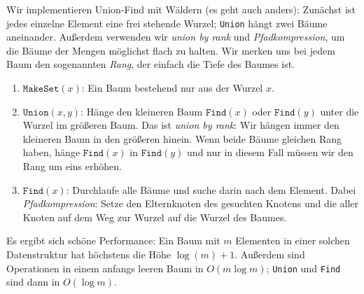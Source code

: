 \documentclass[11pt]{scrartcl}
\begin{document}
Wir implementieren Union-Find mit Wäldern (es geht auch anders): Zunächst ist jedes einzelne Element eine frei stehende Wurzel; \texttt{Union} hängt zwei Bäume aneinander. Außerdem verwenden wir \textit{union by rank} und \textit{Pfadkompression}, um die Bäume der Mengen möglichst flach zu halten. Wir merken uns bei jedem Baum den sogenannten \textit{Rang}, der einfach die Tiefe des Baumes ist.

\begin{enumerate}
\item $\texttt{MakeSet}(x)$: Ein Baum bestehend nur aus der Wurzel $x$.
\item $\texttt{Union}(x,y)$: Hänge den kleineren Baum $\texttt{Find}(x)$ oder $\texttt{Find}(y)$ unter die Wurzel im größeren Baum. Das ist \textit{union by rank}: Wir hängen immer den kleineren Baum in den größeren hinein. Wenn beide Bäume gleichen Rang haben, hänge $\texttt{Find}(x)$ in $\texttt{Find}(y)$ und nur in diesem Fall müssen wir den Rang um eins erhöhen.
\item $\texttt{Find}(x)$: Durchlaufe alle Bäume und suche darin nach dem Element. Dabei \textit{Pfadkompression}: Setze den Elternknoten des gesuchten Knotens und die aller Knoten auf dem Weg zur Wurzel auf die Wurzel des Baumes.
\end{enumerate}

Es ergibt sich schöne Performance: Ein Baum mit $m$ Elementen in einer solchen Datenstruktur hat höchstens die Höhe $\log(m) + 1$. Außerdem sind Operationen in einem anfangs leeren Baum in $O(m \log m)$; \texttt{Union} und \texttt{Find} sind dann in $O(\log m)$.
\end{document}
